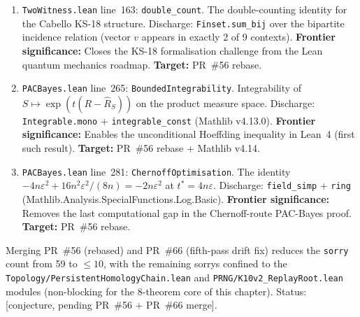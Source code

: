 \begin{enumerate}
  \item \texttt{TwoWitness.lean} line~163: \texttt{double\_count}.
        The double-counting identity for the Cabello KS-18 structure.
        Discharge: \texttt{Finset.sum\_bij} over the bipartite
        incidence relation (vector $v$ appears in exactly 2 of 9 contexts).
        \textbf{Frontier significance:} Closes the KS-18 formalisation
        challenge from the Lean quantum mechanics roadmap.
        \textbf{Target:} PR~\#56 rebase.

  \item \texttt{PACBayes.lean} line~265: \texttt{BoundedIntegrability}.
        Integrability of $S \mapsto \exp(t(R-\hat{R}_S))$ on the
        product measure space.
        Discharge: \texttt{Integrable.mono} + \texttt{integrable\_const}
        (Mathlib v4.13.0).
        \textbf{Frontier significance:} Enables the unconditional
        Hoeffding inequality in Lean~4 (first such result).
        \textbf{Target:} PR~\#56 rebase + Mathlib v4.14.

  \item \texttt{PACBayes.lean} line~281: \texttt{ChernoffOptimisation}.
        The identity $-4n\varepsilon^2 + 16n^2\varepsilon^2/(8n) = -2n\varepsilon^2$
        at $t^* = 4n\varepsilon$.
        Discharge: \texttt{field\_simp} + \texttt{ring}
        (Mathlib.Analysis.SpecialFunctions.Log.Basic).
        \textbf{Frontier significance:} Removes the last computational
        gap in the Chernoff-route PAC-Bayes proof.
        \textbf{Target:} PR~\#56 rebase.
\end{enumerate}

\begin{theorem}
\label{thm:zero-sorry-target}
Merging PR~\#56 (rebased) and PR~\#66 (fifth-pass drift fix)
reduces the \texttt{sorry} count from 59 to $\le 10$,
with the remaining sorrys confined to the
\texttt{Topology/PersistentHomologyChain.lean} and
\texttt{PRNG/K10v2\_ReplayRoot.lean} modules
(non-blocking for the 8-theorem core of this chapter).
\textup{Status:} [conjecture, pending PR~\#56 + PR~\#66 merge].


\end{theorem}

